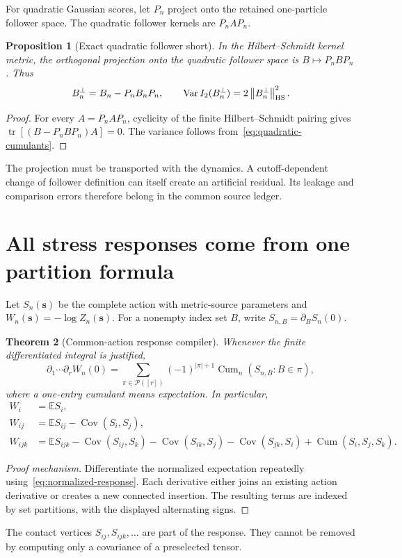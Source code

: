 \documentclass[11pt,a4paper,oneside]{book}
\theoremstyle{plain}
\newtheorem{theorem}{Theorem}[chapter]
\newtheorem{proposition}[theorem]{Proposition}
\theoremstyle{definition}
\theoremstyle{remark}
\newcommand{\E}{\mathbb E}
\newcommand{\tr}{\operatorname{tr}}
\newcommand{\Cov}{\operatorname{Cov}}
\newcommand{\Var}{\operatorname{Var}}
\newcommand{\Cum}{\operatorname{Cum}}
\newcommand{\norm}[1]{\left\lVert#1\right\rVert}
\newcommand{\src}[2]{\cite{#1}}
\begin{document}
For quadratic Gaussian scores, let $P_n$ project onto the retained one-particle follower space. The quadratic follower kernels are $P_nAP_n$.

\begin{proposition}[Exact quadratic follower short]
\label{prop:follower}
In the Hilbert--Schmidt kernel metric, the orthogonal projection onto the quadratic follower space is $B\mapsto P_nBP_n$. Thus
\begin{equation}
 B_n^\perp=B_n-P_nB_nP_n,\qquad
 \Var I_2(B_n^\perp)=2\norm{B_n^\perp}_{\rm HS}^2.
 \label{eq:follower-short}
\end{equation}
\end{proposition}
\begin{proof}
For every $A=P_nAP_n$, cyclicity of the finite Hilbert--Schmidt pairing gives $\tr[(B-P_nBP_n)A]=0$. The variance follows from~\eqref{eq:quadratic-cumulants}.
\end{proof}
\src{R18}{thm:v18v39-quadratic-projection}
The projection must be transported with the dynamics. A cutoff-dependent change of follower definition can itself create an artificial residual. Its leakage and comparison errors therefore belong in the common source ledger.

\section{All stress responses come from one partition formula}
Let $S_n(\bm s)$ be the complete action with metric-source parameters and $W_n(\bm s)=-\log Z_n(\bm s)$. For a nonempty index set $B$, write $S_{n,B}=\partial_BS_n(0)$.

\begin{theorem}[Common-action response compiler]
\label{thm:response-compiler}
Whenever the finite differentiated integral is justified,
\begin{equation}
 \partial_1\cdots\partial_rW_n(0)
 =\sum_{\pi\in\mathcal P([r])}(-1)^{|\pi|+1}
 \Cum_n(S_{n,B}:B\in\pi),
 \label{eq:partition-compiler}
\end{equation}
where a one-entry cumulant means expectation. In particular,
\begin{align}
 W_i&=\E S_i,\\
 W_{ij}&=\E S_{ij}-\Cov(S_i,S_j),\\
 W_{ijk}&=\E S_{ijk}-\Cov(S_{ij},S_k)-\Cov(S_{ik},S_j)
 -\Cov(S_{jk},S_i)+\Cum(S_i,S_j,S_k).
 \label{eq:third-response}
\end{align}
\end{theorem}
\begin{proof}[Proof mechanism]
Differentiate the normalized expectation repeatedly using~\eqref{eq:normalized-response}. Each derivative either joins an existing action derivative or creates a new connected insertion. The resulting terms are indexed by set partitions, with the displayed alternating signs.
\end{proof}
\src{R18}{thm:v18v40-response-compiler}
The contact vertices $S_{ij},S_{ijk},\ldots$ are part of the response. They cannot be removed by computing only a covariance of a preselected tensor.
\end{document}
